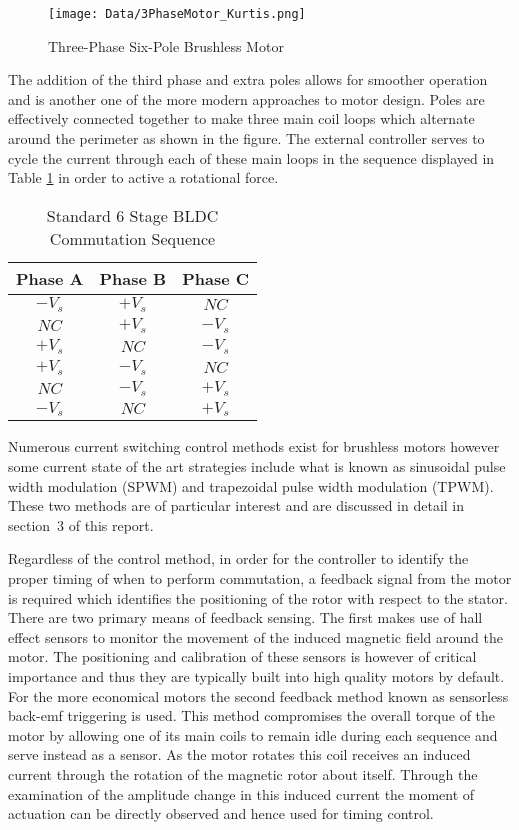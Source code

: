 \documentclass[12pt]{article}
\begin{document}
\begin{figure}[H]
\centering
\caption{Three-Phase Six-Pole Brushless Motor\cite{wilson_2012}}
\texttt{[image: Data/3PhaseMotor\_Kurtis.png]}
\label{BLDC}
\end{figure}

The addition of the third phase and extra poles allows for smoother operation and is another one of the more modern approaches to motor design. Poles are effectively connected together to make three main coil loops which alternate around the perimeter as shown in the figure. The external controller serves to cycle the current through each of these main loops in the sequence displayed in Table \ref{Control_Sequence} in order to active a rotational force.

\begin{table}[H]
\centering
\caption{Standard 6 Stage BLDC Commutation Sequence}
\label{Control_Sequence}
\begin{tabular}{|c|c|c|}
\hline
\textbf{Phase A}&\textbf{Phase B}&\textbf{Phase C}\\ \hline
$-V_{s}$&$+V_{s}$&$NC$\\ \hline
$NC$&$+V_{s}$& $-V_{s}$\\ \hline
$+V_{s}$&$NC$& $-V_{s}$\\ \hline
$+V_{s}$&$-V_{s}$& $NC$\\ \hline
$NC$&$-V_{s}$& $+V_{s}$\\ \hline
$-V_{s}$& $NC$& $+V_{s}$\\ \hline
\end{tabular}
\end{table}

Numerous current switching control methods exist for brushless motors however some current state of the art strategies include what is known as sinusoidal pulse width modulation (SPWM) and trapezoidal pulse width modulation (TPWM). These two methods are of particular interest and are discussed in detail in section~3 of this report.

Regardless of the control method, in order for the controller to identify the proper timing of when to perform commutation, a feedback signal from the motor is required which identifies the positioning of the rotor with respect to the stator. There are two primary means of feedback sensing. The first makes use of hall effect sensors to monitor the movement of the induced magnetic field around the motor. The positioning and calibration of these sensors is however of critical importance and thus they are typically built into high quality motors by default. For the more economical motors the second feedback method known as sensorless back-emf triggering is used. This method compromises the overall torque of the motor by allowing one of its main coils to remain idle during each sequence and serve instead as a sensor. As the motor rotates this coil receives an induced current through the rotation of the magnetic rotor about itself. Through the examination of the amplitude change in this induced current the moment of actuation can be directly observed and hence used for timing control. 
\end{document}
